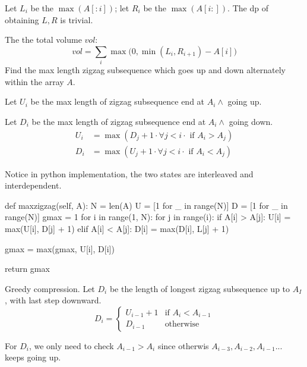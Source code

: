 Let $L_i$ be the $\max(A[:i])$; let $R_i$ be the $\max(A[i:])$. The dp of obtaining $L, R$ is trivial. 

The the total volume $vol$:
$$
vol = \sum_i\max\big(0,\min(L_i, R_{i+1})-A[i]\big)
$$
 Find the max length zigzag subsequence which goes up and down alternately within the array $A$.

Let $U_i$ be the max length of zigzag subsequence end at $A_i \wedge$ going up.

Let $D_i$ be the max length of zigzag subsequence end at $A_i \wedge$ going down.
\begin{align*}
U_i &= \max(D_j+1 \cdot \forall j < i \cdot \text{ if $A_i > A_j$})  \\ 
D_i &= \max(U_j+1 \cdot \forall j < i \cdot \text{ if $A_i < A_j$})  
\end{align*}

Notice in python implementation, the two states are interleaved and interdependent. 
\begin{python}
def maxzigzag(self, A):
    N = len(A)
    U = [1 for _ in range(N)]
    D = [1 for _ in range(N)]
    gmax = 1
    for i in range(1, N):
        for j in range(i):
            if A[i] > A[j]:
                U[i] = max(U[i], D[j] + 1)
            elif A[i] < A[j]:
                D[i] = max(D[i], L[j] + 1)

            gmax = max(gmax, U[i], D[i])

    return gmax
\end{python}
Greedy compression. Let $D_i$ be the length of longest zigzag subsequence up to $A_I$, with last step downward. 
\[
D_i =
  \begin{cases}
   U_{i-1} + 1 &\text{if } A_{i} < A_{i-1}  \\
   D_{i-1} & \text{otherwise}
\end{cases}
\]

For $D_i$, we only need to check $A_{i-1} > A_{i}$ since otherwis $A_{i-3}, A_{i-2}, A_{i-1}...$ keeps going up.

